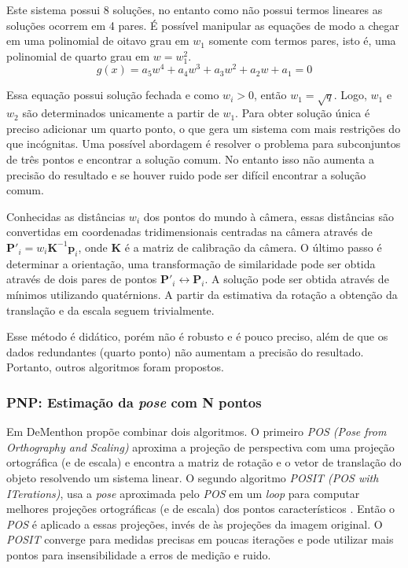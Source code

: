 Este sistema possui 8 soluções, no entanto como não possui termos lineares as soluções ocorrem em 4 pares. É possível manipular as equações de modo a chegar em uma polinomial de oitavo grau em $w_1$ somente com termos pares, isto é, uma polinomial de quarto grau em $w = w_1^2$.
\begin{equation}
g(x) = a_5 w^4 + a_4 w^3 + a_3 w^2 + a_2 w + a_1 = 0
\end{equation}

Essa equação possui solução fechada e como $w_i > 0$, então $w_1 = \sqrt{q}$. Logo, $w_1$ e $w_2$ são determinados unicamente a partir de $w_1$. Para obter solução única é preciso adicionar um quarto ponto, o que gera um sistema com mais restrições do que incógnitas. Uma possível abordagem é resolver o problema para subconjuntos de três pontos e encontrar a solução comum. No entanto isso não aumenta a precisão do resultado e se houver ruido pode ser difícil encontrar a solução comum. 

Conhecidas as distâncias $w_i$ dos pontos do mundo à câmera, essas distâncias são convertidas em coordenadas tridimensionais centradas na câmera através de $\bm{P'}_i = w_i \bm{K}^{-1} \bm{p}_i$, onde $\bm{K}$ é a matriz de calibração da câmera. O último passo é determinar a orientação, uma transformação de similaridade pode ser obtida através de dois pares de pontos $\bm{P'}_i \leftrightarrow \bm{P}_i$. A solução pode ser obtida através de mínimos utilizando quatérnions. A partir da estimativa da rotação a obtenção da translação e da escala seguem trivialmente. 

Esse método é didático, porém não é robusto e é pouco preciso, além de que os dados redundantes (quarto ponto) não aumentam a precisão do resultado. Portanto, outros algoritmos foram propostos.

\subsubsection{PNP: Estimação da \textit{pose} com N pontos}
Em \cite{dementhon1995model} DeMenthon propõe combinar dois algoritmos. O primeiro \textit{POS (Pose from Orthography and Scaling)} aproxima a projeção de perspectiva com uma projeção ortográfica (e de escala) e encontra a matriz de rotação e o vetor de translação do objeto resolvendo um sistema linear. O segundo algoritmo \textit{POSIT (POS with ITerations)}, usa a \textit{pose} aproximada pelo \textit{POS} em um \textit{loop} para computar melhores projeções ortográficas (e de escala) dos pontos característicos \cite{note}. Então o \textit{POS} é aplicado a essas projeções, invés de às projeções da imagem original. O \textit{POSIT} converge para medidas precisas em poucas iterações e pode utilizar mais pontos para insensibilidade a erros de medição e ruido. 

